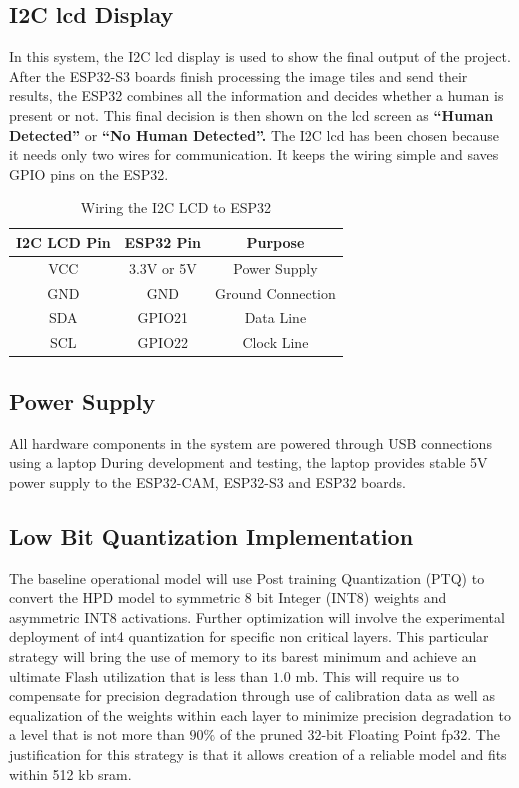 \subsection{\textbf{I2C \gls{lcd} Display}}
In this system, the I2C \gls{lcd} display is used to show the final output of the project. After the ESP32-S3 boards finish processing the image tiles and send their results, the ESP32 combines all the information and decides whether a human is present or not. This final decision is then shown on the \gls{lcd} screen as \textbf{“Human Detected”} or \textbf{“No Human Detected”.} The I2C \gls{lcd} has been chosen because it needs only two wires for communication. It keeps the wiring simple and saves GPIO pins on the ESP32.

\begin{table}[h]
\centering
\caption{Wiring the I2C LCD to ESP32}
\begin{tabular}{|c|c|c|}
\hline
\textbf{I2C LCD Pin} & \textbf{ESP32 Pin} & \textbf{Purpose}     \\ \hline
VCC                  & 3.3V or 5V         & Power Supply         \\ \hline
GND                  & GND                & Ground Connection    \\ \hline
SDA                  & GPIO21             & Data Line            \\ \hline
SCL                  & GPIO22             & Clock Line           \\ \hline
\end{tabular}
\end{table}


\subsection{\textbf{Power Supply}}
All hardware components in the system are powered through USB connections using a laptop During development and testing, the laptop provides stable 5V power supply to the ESP32-CAM, ESP32-S3 and ESP32 boards. 
\subsection{Low Bit Quantization Implementation}
The baseline operational model will use Post training Quantization (PTQ) to convert the HPD model to symmetric 8 bit Integer (INT8) weights and asymmetric INT8 activations. 
Further optimization will involve the experimental deployment of \gls{int4} quantization for specific non critical layers. This particular strategy will bring the use of memory to its barest minimum and achieve an ultimate Flash utilization that is less than $1.0$ \gls{mb}. This will require us to compensate for precision degradation through use of calibration data as well as equalization of the weights within each layer to minimize precision degradation to a level that is not more than $90\%$ of the pruned 32-bit Floating Point \gls{fp32}. The justification for this strategy is that it allows creation of a reliable model and fits within 512 \gls{kb} \gls{sram}.

